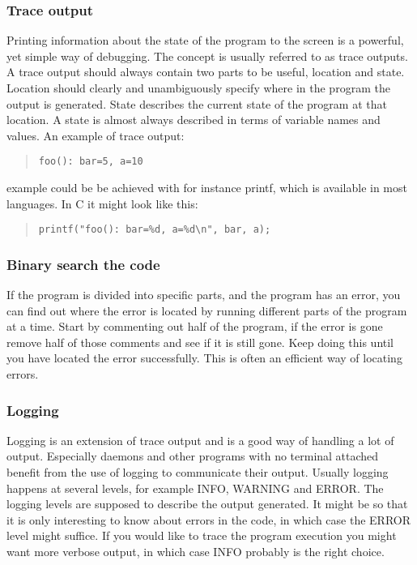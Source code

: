 \documentclass[11pt,a4paper,twoside]{article}
\begin{document}
\subsubsection{Trace output}

Printing information about the state of the program to the screen is a
powerful, yet simple way of debugging. The concept is usually referred to as
trace outputs. A trace output should always contain two parts to be useful,
location and state. Location should clearly and unambiguously specify where in
the program the output is generated. State describes the current state of the
program at that location. A state is almost always described in terms of
variable names and values. An example of trace output:

\begin{quote}
\begin{verbatim}
foo(): bar=5, a=10
\end{verbatim}
\end{quote}

 example could be be achieved with for instance printf, which is available
in most languages. In C it might look like this:

\begin{quote}
\begin{verbatim}
printf("foo(): bar=%d, a=%d\n", bar, a);
\end{verbatim}
\end{quote}


\subsubsection{Binary search the code}
If the program is divided into specific parts, and the program has an error,
 you can find out where the error is located by running different parts of the 
 program at a time. Start by commenting out half of the program, if the 
 error is gone remove half of those comments and see if it is still gone. Keep
 doing this until you have located the error successfully. This is often an efficient
 way of locating errors.

\subsubsection{Logging}

Logging is an extension of trace output and is a good way of handling a lot of
output. Especially daemons and other programs with no terminal attached benefit
from the use of logging to communicate their output. Usually logging happens at
several levels, for example \textsc{INFO}, \textsc{WARNING} and \textsc{ERROR}.
The logging levels are supposed to describe the output generated. It might be
so that it is only interesting to know about errors in the code, in which case
the \textsc{ERROR} level might suffice. If you would like to trace the program
execution you might want more verbose output, in which case \textsc{INFO}
probably is the right choice. 
\end{document}
